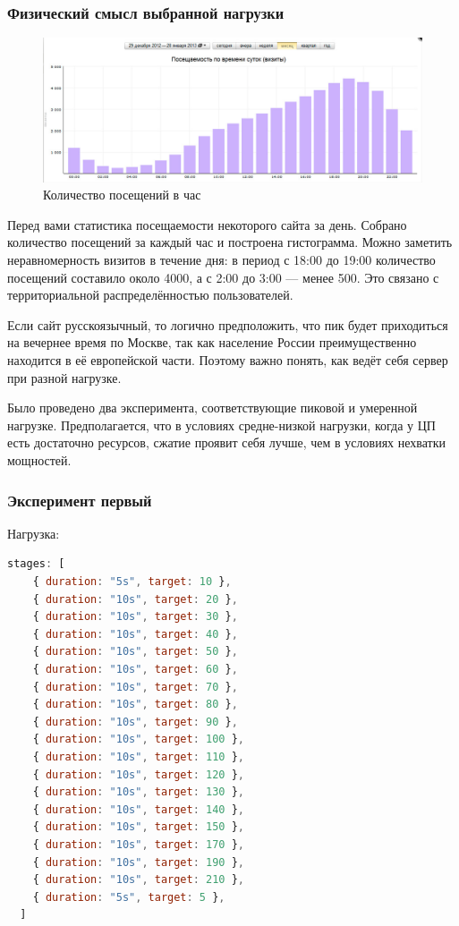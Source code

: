 \documentclass[12pt]{article}
\begin{document}
\subsubsection{Физический смысл выбранной нагрузки}

\begin{figure}[H]
    \centering
    \includegraphics[width=1\textwidth]{../images/pedsovet.png}
    \caption{Количество посещений в час}
\end{figure}

Перед вами статистика посещаемости некоторого сайта за день. Собрано количество посещений за каждый час и построена гистограмма.
Можно заметить неравномерность визитов в течение дня: в период с 18:00 до 19:00 количество посещений составило около 4000,
а с 2:00 до 3:00 — менее 500. Это связано с территориальной распределённостью пользователей.

Если сайт русскоязычный, то логично предположить, что пик будет приходиться на вечернее время по Москве,
так как население России преимущественно находится в её европейской части. Поэтому важно понять, как ведёт себя сервер при разной нагрузке.

Было проведено два эксперимента, соответствующие пиковой и умеренной нагрузке.
Предполагается, что в условиях средне-низкой нагрузки, когда у ЦП есть достаточно ресурсов, сжатие проявит себя лучше, чем в условиях нехватки мощностей.

\subsubsection{Эксперимент первый}

Нагрузка:

\begin{lstlisting}[language=JavaScript]
  stages: [
    { duration: "5s", target: 10 },
    { duration: "10s", target: 20 },
    { duration: "10s", target: 30 },
    { duration: "10s", target: 40 },
    { duration: "10s", target: 50 },
    { duration: "10s", target: 60 },
    { duration: "10s", target: 70 },
    { duration: "10s", target: 80 },
    { duration: "10s", target: 90 },
    { duration: "10s", target: 100 },
    { duration: "10s", target: 110 },
    { duration: "10s", target: 120 },
    { duration: "10s", target: 130 },
    { duration: "10s", target: 140 },
    { duration: "10s", target: 150 },
    { duration: "10s", target: 170 },
    { duration: "10s", target: 190 },
    { duration: "10s", target: 210 },
    { duration: "5s", target: 5 },
  ]
\end{lstlisting}
\end{document}
